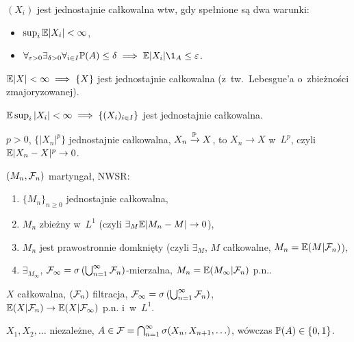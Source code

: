 	\begin{fact}
		$(X_i)$ jest jednostajnie całkowalna wtw, gdy 
		spełnione są dwa warunki:
		\begin{itemize}
			\item $\sup_i \E |X_i| < \infty$,
			\item $\forall_{\varepsilon > 0}
			\exists_{\delta > 0}
			\forall_{i \in I}
			\P(A) \leq \delta \implies \E |X_i| \1_A \leq \varepsilon$.
		\end{itemize}

	\end{fact}
	
	\begin{example}
		$\E |X| < \infty \implies \{ X \}$ jest jednostajnie całkowalna
		(z~tw.~Lebesgue'a o~zbieżności zmajoryzowanej).
	\end{example}
	
	\begin{example}
		$\E \sup_i |X_i| < \infty \implies \{ (X_i)_{i \in I} \}$
		jest jednostajnie całkowalna.
	\end{example}
	
	\begin{theorem}
		$p>0$, $\{ |X_n|^p \}$ jednostajnie całkowalna,
		$X_n \xrightarrow \P X$, to $X_n \to X$ w~$L^p$,
		czyli $\E |X_n - X|^p \to 0$.
	\end{theorem}
	
	\begin{theorem}
		$(M_n, \F_n)$ martyngał, NWSR:
		\begin{enumerate}
			\item $\{ M_n \}_{n \geq 0}$ jednostajnie całkowalna,
			\item $M_n$ zbieżny w~$L^1$
			(czyli $\exists_M \E |M_n - M| \to 0$),
			\item $M_n$ jest prawostronnie domknięty
			(czyli $\exists_M$, $M$ całkowalne, 
			$M_n = \E(M | \F_n)$),
			\item $\exists_{M_\infty}$, 
			$\F_\infty=\sigma\left( \bigcup_{n=1}^\infty \F_n \right)
			$-mierzalna, 
			$M_n = \E (M_\infty | \F_n)$ p.n..
		\end{enumerate}

	\end{theorem}
	
	\begin{corollary}
		$X$ całkowalna, $(\F_n)$ filtracja, 
		$\F_\infty = \sigma\left( \bigcup_{n=1}^\infty \F_n \right)$,
		\\ ${\E( X|\F_n) \to \E(X|\F_\infty)}$ p.n. i~w~$L^1$.
	\end{corollary}
	
	\begin{corollary}
		$X_1, X_2, \ldots$ niezależne, 
		$A \in \F = \bigcap_{n=1}^\infty \sigma(X_n, X_{n+1}, \ldots)$,
		wówczas $\P(A) \in \{0,1\}$.
	\end{corollary}















 
 
